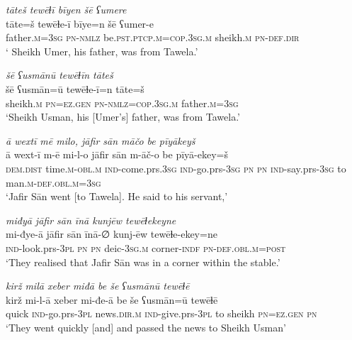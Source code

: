 \ea \label{ŠJ.57}
\textit{tāteš tewēɫī bīyen šē ʕumere} \\ 
\gll tāte=š tewēɫe-ī bīye=n šē ʕumer-e \\ 
 father\textsc{.m}\textsc{=3sg} \textsc{pn}\textsc{-nmlz} be\textsc{.pst}\textsc{.ptcp}\textsc{.m}\textsc{=cop}\textsc{.3sg}\textsc{.m} sheikh\textsc{.m} \textsc{pn}\textsc{-def}\textsc{.dir} \\ 
\glt ` Sheikh Umer, his father, was from Tawela.'
\z 
 
\ea \label{ŠJ.58}
\textit{šē ʕusmānū tewēɫīn tāteš} \\ 
\gll šē ʕusmān=ū tewēɫe-ī=n tāte=š \\ 
 sheikh\textsc{.m} \textsc{pn}\textsc{=ez.gen} \textsc{pn}\textsc{-nmlz}\textsc{=cop}\textsc{.3sg}\textsc{.m} father\textsc{.m}\textsc{=3sg} \\ 
\glt `Sheikh Usman, his [Umer’s] father, was from Tawela.'
\z 
 
\ea \label{ŠJ.59}
\textit{ā wextī mē milo, jāfir sān māčo be pīyākeyš} \\ 
\gll ā wext-ī m-ē mi-l-o jāfir sān m-āč-o be pīyā-ekey=š \\ 
 \textsc{dem.dist} time\textsc{.m}\textsc{-obl}\textsc{.m} \textsc{ind-}come.prs\textsc{.3sg} \textsc{ind-}go.prs\textsc{-3sg} \textsc{pn} \textsc{pn} \textsc{ind-}say.prs\textsc{-3sg} to man\textsc{.m}\textsc{-def}\textsc{.obl}\textsc{.m}\textsc{=3sg} \\ 
\glt `Jafir Sān went [to Tawela]. He said to his servant,'
\z 
 
\ea \label{ŠJ.67}
\textit{miđyā jāfir sān īnā kunjēw tewēɫekeyne} \\ 
\gll mi-đye-ā jāfir sān īnā-∅ kunj-ēw tewēɫe-ekey=ne \\ 
 \textsc{ind-}look.prs\textsc{-3pl} \textsc{pn} \textsc{pn} deic\textsc{-3sg}\textsc{.m} corner\textsc{-indf} \textsc{pn}\textsc{-def}\textsc{.obl}\textsc{.m}\textsc{=\textsc{post}} \\ 
\glt `They realised that Jafir Sān was in a corner within the stable.'
\z 
 
\ea \label{ŠJ.68}
\textit{kirž milā xeber miđā be še ʕusmānū tewēɫē} \\ 
\gll kirž mi-l-ā xeber mi-đe-ā be še ʕusmān=ū tewēɫē \\ 
 quick \textsc{ind-}go.prs\textsc{-3pl} news\textsc{.dir}\textsc{.m} \textsc{ind-}give.prs\textsc{-3pl} to sheikh \textsc{pn}\textsc{=ez.gen} \textsc{pn} \\ 
\glt `They went quickly [and] and passed the news to Sheikh Usman'
\z 
 
